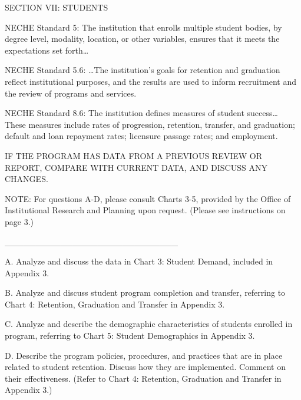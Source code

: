 SECTION VII: STUDENTS

NECHE Standard 5: The institution that enrolls multiple student bodies, by degree level, modality, location, or other variables, ensures that it meets the expectations set forth…

NECHE Standard 5.6: …The institution’s goals for retention and graduation reflect institutional purposes, and the results are used to inform recruitment and the review of programs and services.

NECHE Standard 8.6: The institution defines measures of student success… These measures include rates of progression, retention, transfer, and graduation; default and loan repayment rates; licensure passage rates; and employment.

IF THE PROGRAM HAS DATA FROM A PREVIOUS REVIEW OR REPORT, COMPARE WITH CURRENT DATA, AND DISCUSS ANY CHANGES.

NOTE: For questions A-D, please consult Charts 3-5, provided by the Office of Institutional Research and Planning upon request. (Please see instructions on page 3.)

____________________________

A. Analyze and discuss the data in Chart 3: Student Demand, included in Appendix 3.



B. Analyze and discuss student program completion and transfer, referring to Chart 4: Retention, Graduation and Transfer in Appendix 3.



C. Analyze and describe the demographic characteristics of students enrolled in program, referring to Chart 5: Student Demographics in Appendix 3.



D. Describe the program policies, procedures, and practices that are in place related to student retention. Discuss how they are implemented. Comment on their effectiveness.
(Refer to Chart 4: Retention, Graduation and Transfer in Appendix 3.)
